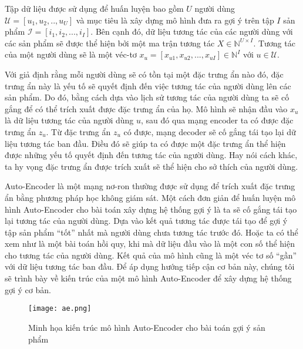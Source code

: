 

   Tập dữ liệu được sử dụng để huấn luyện bao gồm $U$ người dùng $\mathcal{U} = [u_1,u_2, .., u_U]$ và mục tiêu là xây dựng mô hình đưa ra gợi ý trên tập $I$ sản phẩm $\mathcal{I} = [i_1,i_2, ..., i_I]$. 
    Bên cạnh đó, dữ liệu tương tác của các người dùng với các sản phẩm sẽ được thể hiện bởi một ma trận tương tác $X \in \mathbb{N}^{U\times I}$. 
    Tương tác của một người dùng sẽ là một véc-tơ $x_u = [x_{u1}, x_{u2}, ..., x_{uI}] \in \mathbb{N}^I $ với $u \in \mathcal{U}$.
    
    Với giả định rằng mỗi người dùng sẽ có tồn tại một đặc trưng ẩn nào đó, đặc trưng ẩn này là yếu tố sẽ quyết định đến việc tương tác của người dùng lên các sản phẩm.
    Do đó, bằng cách dựa vào lịch sử tương tác của người dùng ta sẽ cố gắng để có thể trích xuất được đặc trưng ẩn của họ.
    Mô hình sẽ nhận đầu vào $x_u$ là dữ liệu tương tác của người dùng $u$, sau đó qua mạng encoder ta có được đặc trưng ẩn $z_u$.
    Từ đặc trưng ẩn $z_u$ có được, mạng decoder sẽ cố gắng tái tạo lại dữ liệu tương tác ban đầu.
    Điều đó sẽ giúp ta có được một đặc trưng ẩn thể hiện được những yếu tố quyết định đến tương tác của người dùng.
    Hay nói cách khác, ta hy vọng đặc trưng ẩn được trích xuất sẽ thể hiện cho sở thích của người dùng. 

    Auto-Encoder là một mạng nơ-ron thường được sử dụng để trích xuất đặc trưng ẩn bằng phương pháp học không giám sát.
    Một cách đơn giản để huấn luyện mô hình Auto-Encoder cho bài toán xây dựng hệ thống gợi ý là ta sẽ cố gắng tái tạo lại tương tác của người dùng.
    Dựa vào kết quả tương tác được tái tạo để gợi ý tập sản phẩm ``tốt'' nhất mà người dùng chưa tương tác trước đó. 
    Hoặc ta có thể xem như là một bài toán hồi quy, khi mà dữ liệu đầu vào là một con số thể hiện cho tương tác của người dùng.
    Kết quả của mô hình cũng là một véc tơ số ``gần'' với dữ liệu tương tác ban đầu.  
    Để áp dụng hướng tiếp cận cơ bản này, chúng tôi sẽ trình bày về kiến trúc của một mô hình Auto-Encoder để xây dựng hệ thống gợi ý cơ bản.
    \begin{figure}
        \centering
        \texttt{[image: ae.png]}
        \caption{Minh họa kiến trúc mô hình Auto-Encoder cho bài toán gợi ý sản phẩm}
        \label{fig_recae}
    \end{figure}

